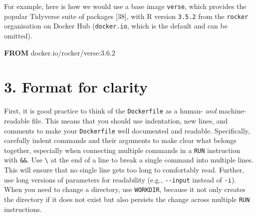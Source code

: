 \documentclass[10pt,letterpaper]{article}
\newenvironment{Shaded}{\begin{snugshade}}{\end{snugshade}}
\newcommand{\KeywordTok}[1]{\textcolor[rgb]{0.13,0.29,0.53}{\textbf{#1}}}
\newcommand{\NormalTok}[1]{#1}
\begin{document}
For example, here is how we would use a base image \texttt{verse}, which
provides the popular Tidyverse suite of packages {[}38{]}, with R
version \texttt{3.5.2} from the \texttt{rocker} organisation on Docker
Hub (\texttt{docker.io}, which is the default and can be omitted).

\footnotesize

\begin{Shaded}
\begin{Highlighting}[]
\KeywordTok{FROM}\NormalTok{ docker.io/rocker/verse:3.6.2}
\end{Highlighting}
\end{Shaded}

\normalsize

\hypertarget{format-for-clarity}{%
\section{3. Format for clarity}\label{format-for-clarity}}

  \label{rule:formatting} 
  \label{rule:clarity} 

First, it is good practice to think of the \texttt{Dockerfile} as a
human- \emph{and} machine-readable file. This means that you should use
indentation, new lines, and comments to make your \texttt{Dockerfile}
well documented and readable. Specifically, carefully indent commands
and their arguments to make clear what belongs together, especially when
connecting multiple commands in a \texttt{RUN} instruction with
\texttt{\&\&}. Use \texttt{\textbackslash{}} at the end of a line to
break a single command into multiple lines. This will ensure that no
single line gets too long to comfortably read. Further, use long
versions of parameters for readability (e.g., \texttt{-\/-input} instead
of \texttt{-i}). When you need to change a directory, use
\texttt{WORKDIR}, because it not only creates the directory if it does
not exist but also persists the change across multiple \texttt{RUN}
instructions.
\end{document}
